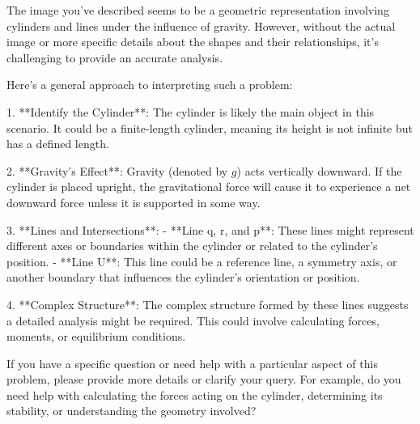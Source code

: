The image you've described seems to be a geometric representation involving cylinders and lines under the influence of gravity. However, without the actual image or more specific details about the shapes and their relationships, it's challenging to provide an accurate analysis.

Here’s a general approach to interpreting such a problem:

1. **Identify the Cylinder**: The cylinder is likely the main object in this scenario. It could be a finite-length cylinder, meaning its height is not infinite but has a defined length.

2. **Gravity's Effect**: Gravity (denoted by \( g \)) acts vertically downward. If the cylinder is placed upright, the gravitational force will cause it to experience a net downward force unless it is supported in some way.

3. **Lines and Intersections**:
   - **Line q, r, and p**: These lines might represent different axes or boundaries within the cylinder or related to the cylinder's position.
   - **Line U**: This line could be a reference line, a symmetry axis, or another boundary that influences the cylinder's orientation or position.

4. **Complex Structure**: The complex structure formed by these lines suggests a detailed analysis might be required. This could involve calculating forces, moments, or equilibrium conditions.

If you have a specific question or need help with a particular aspect of this problem, please provide more details or clarify your query. For example, do you need help with calculating the forces acting on the cylinder, determining its stability, or understanding the geometry involved?